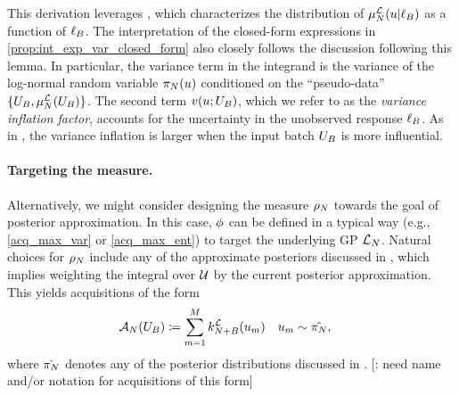 \documentclass[12pt]{article}
\begin{document}
This derivation leverages , which characterizes the distribution of 
$\emMean[\Ndesign]{\llik}(\Par | \designBatchLlik)$ as a function of $\designBatchLlik$.
The interpretation of the closed-form expressions in \ref{prop:int_exp_var_closed_form}
also closely follows the discussion following this lemma. In particular, the variance term in the
integrand is the variance of the log-normal random variable $\llikEmRdmDens[\Ndesign](\Par)$ 
conditioned on the ``pseudo-data'' $\{\designBatchIn, \emMean[\Ndesign]{\llik}(\designBatchIn)\}$.
The second term $\varInflation(\Par; \designBatchIn)$, which we refer to as the 
\textit{variance inflation factor}, accounts for the uncertainty in the unobserved response
 $\designBatchLlik$. As in , the variance inflation is larger when the 
 input batch $\designBatchIn$ is more influential.

\paragraph{Targeting the measure.}
Alternatively, we might consider designing the measure $\weightDens$ towards the goal of 
posterior approximation. In this case, $\qoiMap$ can be defined in a typical way
(e.g., \ref{acq_max_var} or \ref{acq_max_ent}) to target the underlying GP $\llikEm$.  
Natural choices for $\weightDens$ include any of the approximate posteriors discussed 
in , which implies weighting the integral over $\parSpace$ by 
the current posterior approximation. This yields acquisitions of the form
\begin{align}
&\acq[\Ndesign](\designIn[\Nbatch])
\Def \sum_{m=1}^{M} \emKer[\Naugment]{\llik}(\Par_m) 
&&\Par_m \sim \hat{\llikEmRdmDens},
\end{align}
where $\hat{\llikEmRdmDens}$ denotes any of the posterior distributions discussed in 
. [\todo: need name and/or notation for acquisitions of this form]
\end{document}
